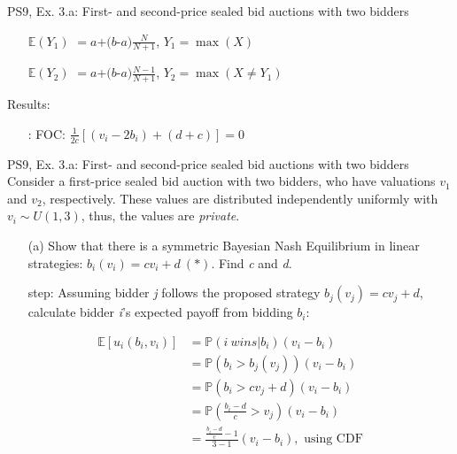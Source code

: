 \begin{frame}{PS9, Ex. 3.a: First- and second-price sealed bid auctions with two bidders}
\begin{multicols}{2}
\begin{enumerate}
        \item[$\mathbb{E}(Y_1)$] $=a$+$(b$-$a)\frac{N}{N+1}$, $Y_1=\max(X)$
        \item[$\mathbb{E}(Y_2)$] $=a$+$(b$-$a)\frac{N-1}{N+1}$, $Y_2=\max(X\neq Y_1)$
      \end{enumerate}
      \vspace{-6pt}
      Results:
      \vspace{-6pt}
      \begin{itemize}
        \item[\nth{2}:] FOC: $\frac{1}{2c}[(v_i-2b_i)+(d+c)]=0$
      \end{itemize}
      \vfill\null
    \end{multicols}
\end{frame}
\begin{frame}{PS9, Ex. 3.a: First- and second-price sealed bid auctions with two bidders}
    Consider a first-price sealed bid auction with two bidders, who have valuations $v_1$ and $v_2$, respectively. These values are distributed independently uniformly with $v_i\sim U(1,3)$, thus, the values are \textit{private}.
    \vspace{-4pt}
    \begin{itemize}
      \item[(a)] Show that there is a symmetric Bayesian Nash Equilibrium in linear strategies: $b_i(v_i) = cv_i + d\ (*)$. Find \textit{c} and \textit{d}.
    \end{itemize}
    \vspace{-8pt}
    \begin{multicols}{2}
      \begin{itemize}
        \item[\nth{1} step:] Assuming bidder \textit{j} follows the proposed strategy $b_j(v_j) = cv_j + d$, calculate bidder \textit{i}'s expected payoff from bidding $b_i$:
      \end{itemize}
      \vspace{-4pt}
      \begin{align*}
        \mathbb{E}[u_i(b_i,v_i)]&=\mathbb{P}(i\ wins|b_i)(v_i-b_i)\\
                                &=\mathbb{P}(b_i>b_j(v_j))(v_i-b_i)\\
                                &=\mathbb{P}(b_i>cv_j+d)(v_i-b_i)\\
                                &=\mathbb{P}\left(\frac{b_i-d}{c}>v_j\right)(v_i-b_i)\\
                                &=\frac{\frac{b_i-d}{c}-1}{3-1}(v_i-b_i),\text{ using CDF}\\

\end{align*}
\end{multicols}
\end{frame}
